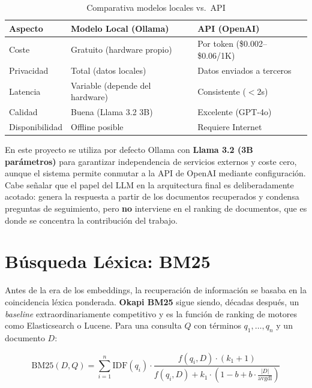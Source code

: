 \documentclass[12pt, a4paper, twoside]{report}
\begin{document}
\begin{table}[H]
\centering
\caption{Comparativa modelos locales vs.\ API}
\label{tab:llm-comparativa}
\begin{tabularx}{\textwidth}{lXX}
\toprule
\textbf{Aspecto} & \textbf{Modelo Local (Ollama)} & \textbf{API (OpenAI)} \\
\midrule
Coste & Gratuito (hardware propio) & Por token (\$0.002--\$0.06/1K) \\
Privacidad & Total (datos locales) & Datos enviados a terceros \\
Latencia & Variable (depende del hardware) & Consistente ($<$2s) \\
Calidad & Buena (Llama 3.2 3B) & Excelente (GPT-4o) \\
Disponibilidad & Offline posible & Requiere Internet \\
\bottomrule
\end{tabularx}
\end{table}

En este proyecto se utiliza por defecto Ollama con \textbf{Llama 3.2 (3B par\'ametros)} para garantizar independencia de servicios externos y coste cero, aunque el sistema permite conmutar a la API de OpenAI mediante configuraci\'on. Cabe se\~nalar que el papel del LLM en la arquitectura final es deliberadamente acotado: genera la respuesta a partir de los documentos recuperados y condensa preguntas de seguimiento, pero \textbf{no} interviene en el ranking de documentos, que es donde se concentra la contribuci\'on del trabajo.

\section{B\'usqueda L\'exica: BM25}
\label{sec:bm25}

Antes de la era de los embeddings, la recuperaci\'on de informaci\'on se basaba en la coincidencia l\'exica ponderada. \textbf{Okapi BM25} \cite{robertson2009} sigue siendo, d\'ecadas despu\'es, un \textit{baseline} extraordinariamente competitivo y es la funci\'on de ranking de motores como Elasticsearch o Lucene. Para una consulta $Q$ con t\'erminos $q_1, \dots, q_n$ y un documento $D$:

\begin{equation}
\text{BM25}(D, Q) = \sum_{i=1}^{n} \text{IDF}(q_i) \cdot
\frac{f(q_i, D) \cdot (k_1 + 1)}{f(q_i, D) + k_1 \cdot \left(1 - b + b \cdot \frac{|D|}{\text{avgdl}}\right)}
\end{equation}
\end{document}
